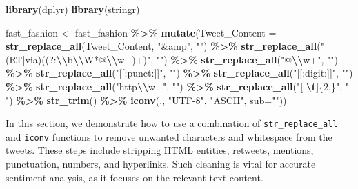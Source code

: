 \documentclass[
]{book}
\newenvironment{Shaded}{\begin{snugshade}}{\end{snugshade}}
\newcommand{\AttributeTok}[1]{\textcolor[rgb]{0.13,0.29,0.53}{#1}}
\newcommand{\FunctionTok}[1]{\textcolor[rgb]{0.13,0.29,0.53}{\textbf{#1}}}
\newcommand{\NormalTok}[1]{#1}
\newcommand{\OtherTok}[1]{\textcolor[rgb]{0.56,0.35,0.01}{#1}}
\newcommand{\SpecialCharTok}[1]{\textcolor[rgb]{0.81,0.36,0.00}{\textbf{#1}}}
\newcommand{\StringTok}[1]{\textcolor[rgb]{0.31,0.60,0.02}{#1}}
\begin{document}
\begin{Shaded}
\begin{Highlighting}[]
\FunctionTok{library}\NormalTok{(dplyr)}
\FunctionTok{library}\NormalTok{(stringr)}

\NormalTok{fast\_fashion }\OtherTok{\textless{}{-}}\NormalTok{ fast\_fashion }\SpecialCharTok{\%\textgreater{}\%}
  \FunctionTok{mutate}\NormalTok{(}\AttributeTok{Tweet\_Content =} \FunctionTok{str\_replace\_all}\NormalTok{(Tweet\_Content, }\StringTok{"\&amp"}\NormalTok{, }\StringTok{""}\NormalTok{) }\SpecialCharTok{\%\textgreater{}\%}
           \FunctionTok{str\_replace\_all}\NormalTok{(}\StringTok{"(RT|via)((?:}\SpecialCharTok{\textbackslash{}\textbackslash{}}\StringTok{b}\SpecialCharTok{\textbackslash{}\textbackslash{}}\StringTok{W*@}\SpecialCharTok{\textbackslash{}\textbackslash{}}\StringTok{w+)+)"}\NormalTok{, }\StringTok{""}\NormalTok{) }\SpecialCharTok{\%\textgreater{}\%}
           \FunctionTok{str\_replace\_all}\NormalTok{(}\StringTok{"@}\SpecialCharTok{\textbackslash{}\textbackslash{}}\StringTok{w+"}\NormalTok{, }\StringTok{""}\NormalTok{) }\SpecialCharTok{\%\textgreater{}\%}
           \FunctionTok{str\_replace\_all}\NormalTok{(}\StringTok{"[[:punct:]]"}\NormalTok{, }\StringTok{""}\NormalTok{) }\SpecialCharTok{\%\textgreater{}\%}
           \FunctionTok{str\_replace\_all}\NormalTok{(}\StringTok{"[[:digit:]]"}\NormalTok{, }\StringTok{""}\NormalTok{) }\SpecialCharTok{\%\textgreater{}\%}
           \FunctionTok{str\_replace\_all}\NormalTok{(}\StringTok{"http}\SpecialCharTok{\textbackslash{}\textbackslash{}}\StringTok{w+"}\NormalTok{, }\StringTok{""}\NormalTok{) }\SpecialCharTok{\%\textgreater{}\%}
           \FunctionTok{str\_replace\_all}\NormalTok{(}\StringTok{"[ }\SpecialCharTok{\textbackslash{}t}\StringTok{]\{2,\}"}\NormalTok{, }\StringTok{" "}\NormalTok{) }\SpecialCharTok{\%\textgreater{}\%}
           \FunctionTok{str\_trim}\NormalTok{() }\SpecialCharTok{\%\textgreater{}\%}
           \FunctionTok{iconv}\NormalTok{(., }\StringTok{"UTF{-}8"}\NormalTok{, }\StringTok{"ASCII"}\NormalTok{, }\AttributeTok{sub=}\StringTok{""}\NormalTok{))}
\end{Highlighting}
\end{Shaded}

In this section, we demonstrate how to use a combination of \texttt{str\_replace\_all} and \texttt{iconv} functions to remove unwanted characters and whitespace from the tweets. These steps include stripping HTML entities, retweets, mentions, punctuation, numbers, and hyperlinks. Such cleaning is vital for accurate sentiment analysis, as it focuses on the relevant text content.
\end{document}

